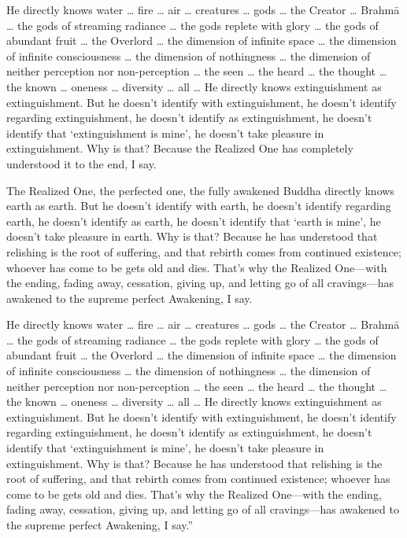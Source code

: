 \documentclass[12pt,openany]{book}%
\begin{document}
He directly knows water … fire … air … creatures … gods … the Creator … \textsanskrit{Brahmā} … the gods of streaming radiance … the gods replete with glory … the gods of abundant fruit … the Overlord … the dimension of infinite space … the dimension of infinite consciousness … the dimension of nothingness … the dimension of neither perception nor non-perception … the seen … the heard … the thought … the known … oneness … diversity … all … He directly knows extinguishment as extinguishment. But he doesn’t identify with extinguishment, he doesn’t identify regarding extinguishment, he doesn’t identify as extinguishment, he doesn’t identify that ‘extinguishment is mine’, he doesn’t take pleasure in extinguishment. Why is that? Because the Realized One has completely understood it to the end, I say. 

The Realized One, the perfected one, the fully awakened Buddha directly knows earth as earth. But he doesn’t identify with earth, he doesn’t identify regarding earth, he doesn’t identify as earth, he doesn’t identify that ‘earth is mine’, he doesn’t take pleasure in earth. Why is that? Because he has understood that relishing is the root of suffering, and that rebirth comes from continued existence; whoever has come to be gets old and dies. That’s why the Realized One—with the ending, fading away, cessation, giving up, and letting go of all cravings—has awakened to the supreme perfect Awakening, I say. 

He directly knows water … fire … air … creatures … gods … the Creator … \textsanskrit{Brahmā} … the gods of streaming radiance … the gods replete with glory … the gods of abundant fruit … the Overlord … the dimension of infinite space … the dimension of infinite consciousness … the dimension of nothingness … the dimension of neither perception nor non-perception … the seen … the heard … the thought … the known … oneness … diversity … all … He directly knows extinguishment as extinguishment. But he doesn’t identify with extinguishment, he doesn’t identify regarding extinguishment, he doesn’t identify as extinguishment, he doesn’t identify that ‘extinguishment is mine’, he doesn’t take pleasure in extinguishment. Why is that? Because he has understood that relishing is the root of suffering, and that rebirth comes from continued existence; whoever has come to be gets old and dies. That’s why the Realized One—with the ending, fading away, cessation, giving up, and letting go of all cravings—has awakened to the supreme perfect Awakening, I say.” 
\end{document}
